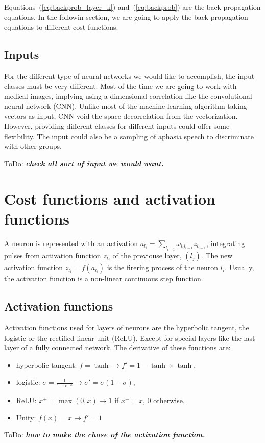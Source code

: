 \documentclass[final, paper=letter,5p,times,twocolumn]{elsarticle}
\newcommand{\ToDo}[1]{ToDo: \textbf{\textit{#1}}}
\begin{document}
Equations~(\ref{eq:backprob_layer_k}) and~(\ref{eq:backprob}) are the back propagation equations. In the followin section, we are going to apply the back propagation equations to different cost functions.


\subsection{Inputs}
For the different type of neural networks we would like to accomplish, the input classes must be very different. Most of the time we are going to work with medical images, implying using a dimensional correlation like the convolutional neural network (CNN). Unlike most of the machine learning algorithm taking vectors as input, CNN void the space decorrelation from the vectorization. However, providing different classes for different inputs could offer some flexibility. The input could also be a sampling of aphasia speech to discriminate with other groups.

\ToDo{check all sort of input we would want.} \\

\section{Cost functions and activation functions}

A neuron is represented with an activation $a_{l_{i}} = \sum_{l_{i-1}}\omega_{l_{i}l_{i-1}} z_{l_{i-1}}$, integrating pulses from activation function $z_{l_{j}}$ of the previouse layer, $(l_{j})$. The new activation function $z_{l_{i}} = f(a_{l_{i}})$ is the firering process of the neuron $l_{i}$. Usually, the activation function is a non-linear continuous step function. 

\subsection{Activation functions}

Activation functions used for layers of neurons are the hyperbolic tangent, the logistic or the rectified linear unit (ReLU). Except for special layers like the last layer of a fully connected network. The derivative of these functions are:

\begin{itemize}
\item hyperbolic tangent: $f = \tanh \rightarrow f' = 1 - \tanh \times \tanh$,
\item logistic: $\sigma = \frac{1}{1+e^{-x}} \rightarrow \sigma' = \sigma (1 - \sigma)$,
\item ReLU: $x^{+} = \max(0,x) \rightarrow 1$ if $x^{+} = x$, 0 otherwise.
\item Unity: $f(x) = x \rightarrow f' = 1$
\end{itemize}
\ToDo{how to make the chose of the activation function.}
\end{document}
